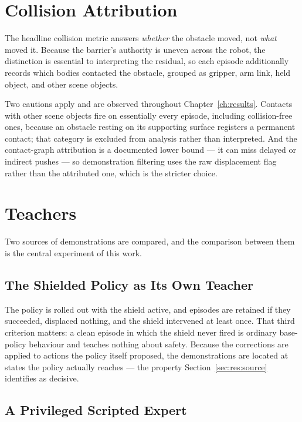 \documentclass[a4paper,11pt]{report}
\begin{document}
\section{Collision Attribution}\label{sec:attribution}

The headline collision metric answers \emph{whether} the obstacle moved, not \emph{what} moved it.
Because the barrier's authority is uneven across the robot, the distinction is essential to
interpreting the residual, so each episode additionally records which bodies contacted the
obstacle, grouped as gripper, arm link, held object, and other scene objects.

Two cautions apply and are observed throughout Chapter~\ref{ch:results}. Contacts with other scene
objects fire on essentially every episode, including collision-free ones, because an obstacle
resting on its supporting surface registers a permanent contact; that category is excluded from
analysis rather than interpreted. And the contact-graph attribution is a documented lower bound ---
it can miss delayed or indirect pushes --- so demonstration filtering uses the raw displacement
flag rather than the attributed one, which is the stricter choice.

\section{Teachers}\label{sec:teachers}

Two sources of demonstrations are compared, and the comparison between them is the central
experiment of this work.

\subsection{The Shielded Policy as Its Own Teacher}\label{sec:teacher_self}

The policy is rolled out with the shield active, and episodes are retained if they succeeded,
displaced nothing, and the shield intervened at least once. That third criterion matters: a clean
episode in which the shield never fired is ordinary base-policy behaviour and teaches nothing about
safety. Because the corrections are applied to actions the policy itself proposed, the
demonstrations are located at states the policy actually reaches --- the property
Section~\ref{sec:res:source} identifies as decisive.

\subsection{A Privileged Scripted Expert}\label{sec:teacher_planner}
\end{document}
